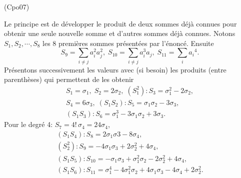 \begin{tiny}(Cpo07)\end{tiny} Le principe est de développer le produit de deux sommes déjà connues pour obtenir une seule nouvelle somme et d'autres sommes déjà connues.\newline
Notons $S_1, S_2,\cdots, S_8$ les 8 premières sommes présentées par l'énoncé. Ensuite
\[
  S_9 = \sum_{i\neq j}a_i^2 a_j^2,\;
  S_{10} = \sum_{i\neq j}a_i^3 a_j,\;
  S_{11} = \sum_{i}{a_i}^4.
\]
Présentons successivement les valeurs avec (si besoin) les produits (entre parenthèses) qui permettent de les obtenir
\begin{multline*}
  S_1 = \sigma_1, \; S_2 = 2 \sigma_2,\; 
  (S_1^2): S_3 = \sigma_1^2 - 2 \sigma_2, \\
  S_4 = 6\sigma_3,\; (S_1S_2): S_5 = \sigma_1 \sigma_2 - 3\sigma_3,\;\\
  (S_1S_3): S_6 = \sigma_1^3 - 3\sigma_1 \sigma_2 + 3\sigma_3.
\end{multline*}
Pour le degré 4: $S_7 = 4!\, \sigma_4 = 24 \sigma_4$,
\begin{multline*}
  (S_1 S_4) : S_8 = 2\sigma_1 \sigma3 - 8 \sigma_4,\\
  (S_2^2): S_9 = -4\sigma_1\sigma_3 + 2\sigma_2^2 + 4 \sigma_4,\\
  (S_1 S_5): S_{10} = -\sigma_1\sigma_3 + \sigma_1^2 \sigma_2 - 2\sigma_2^2 + 4\sigma_4,\\
  (S_1 S_6): S_{11} = \sigma_1^4 - 4 \sigma_1^2 \sigma_2 + 4 \sigma_1 \sigma_3 - 4 \sigma_4 + 2\sigma_2^2.
\end{multline*}

